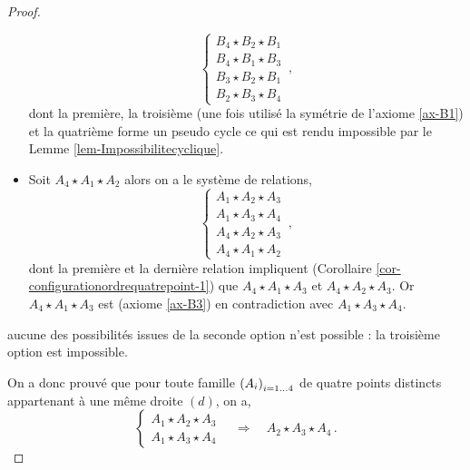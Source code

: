 \begin{cor}
\begin{proof}
\begin{itemize}[$\bullet$]
\begin{equation*}
            \left\{
            \begin{array}{c}
                 B_4 \star B_2 \star B_1 \\
                 B_4 \star B_1 \star B_3 \\
                 B_3 \star B_2 \star B_1 \\
                 B_2 \star B_3 \star B_4
            \end{array}
            \right. \,,    
            \end{equation*}
            dont la première, la troisième (une fois utilisé la symétrie de l'axiome \ref{ax-B1}) et la quatrième forme un pseudo cycle ce qui est rendu impossible par le Lemme \ref{lem-Impossibilitecyclique}.
            \item Soit $A_4 \star A_1 \star A_2$ alors on a le système de relations,
            \begin{equation*}
            \left\{
            \begin{array}{c}
                 A_1 \star A_2 \star A_3 \\
                 A_1 \star A_3 \star A_4 \\
                 A_4 \star A_2 \star A_3 \\
                 A_4 \star A_1 \star A_2
            \end{array}
            \right. \,,    
            \end{equation*}
            dont la première et la dernière relation impliquent (Corollaire \ref{cor-configurationordrequatrepoint-1}) que $A_4 \star A_1 \star A_3$ et $A_4 \star A_2 \star A_3$. Or $A_4 \star A_1 \star A_3$ est (axiome \ref{ax-B3}) en contradiction avec $A_1 \star A_3 \star A_4$. 
        \end{itemize}
        aucune des possibilités issues de la seconde option n'est possible : la troisième option est impossible. 

        On a donc prouvé que pour toute famille $\left(A_{i}\right)_{i = 1\ldots 4}$ de quatre points distincts appartenant à une même droite $(d)$, on a,
        \begin{equation*}
        \left\{
            \begin{array}{c}
                 A_1 \star A_2 \star A_3 \\
                 A_1 \star A_3 \star A_4
            \end{array}
            \right. \quad \Longrightarrow \quad 
                A_2 \star A_3 \star A_4
            \,.
        \end{equation*}
        

\end{proof}
\end{cor}
